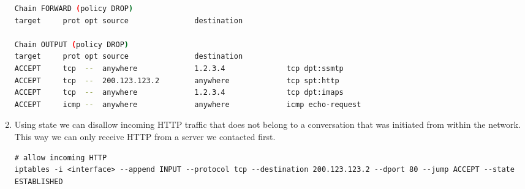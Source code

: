 \documentclass[12pt, a4paper]{article}
\begin{document}
\begin{enumerate}[a]
\begin{lstlisting}[language=bash]
Chain FORWARD (policy DROP)
target     prot opt source               destination

Chain OUTPUT (policy DROP)
target     prot opt source               destination
ACCEPT     tcp  --  anywhere             1.2.3.4              tcp dpt:ssmtp
ACCEPT     tcp  --  200.123.123.2        anywhere             tcp spt:http
ACCEPT     tcp  --  anywhere             1.2.3.4              tcp dpt:imaps
ACCEPT     icmp --  anywhere             anywhere             icmp echo-request
	\end{lstlisting}
	\item %
	Using state we can disallow incoming HTTP traffic that does not belong to a conversation that was initiated from within the network. This way we can only receive HTTP from a server we contacted first.

	\begin{lstlisting}
# allow incoming HTTP
iptables -i <interface> --append INPUT --protocol tcp --destination 200.123.123.2 --dport 80 --jump ACCEPT --state ESTABLISHED
	\end{lstlisting}
\end{enumerate}
\end{document}
